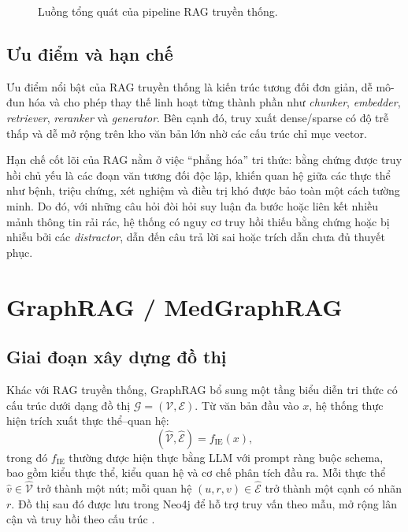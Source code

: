 \documentclass[a4paper,12pt,twoside]{report}
\begin{document}
\begin{figure}[H]
  \centering
  \caption{Luồng tổng quát của pipeline RAG truyền thống.}
  \label{fig:rag-flow}
\end{figure}

\subsection{Ưu điểm và hạn chế}
Ưu điểm nổi bật của RAG truyền thống là kiến trúc tương đối đơn giản, dễ mô-đun hóa và cho phép thay thế linh hoạt từng thành phần như \textit{chunker}, \textit{embedder}, \textit{retriever}, \textit{reranker} và \textit{generator}. Bên cạnh đó, truy xuất dense/sparse có độ trễ thấp và dễ mở rộng trên kho văn bản lớn nhờ các cấu trúc chỉ mục vector.

Hạn chế cốt lõi của RAG nằm ở việc ``phẳng hóa'' tri thức: bằng chứng được truy hồi chủ yếu là các đoạn văn tương đối độc lập, khiến quan hệ giữa các thực thể như bệnh, triệu chứng, xét nghiệm và điều trị khó được bảo toàn một cách tường minh. Do đó, với những câu hỏi đòi hỏi suy luận đa bước hoặc liên kết nhiều mảnh thông tin rải rác, hệ thống có nguy cơ truy hồi thiếu bằng chứng hoặc bị nhiễu bởi các \textit{distractor}, dẫn đến câu trả lời sai hoặc trích dẫn chưa đủ thuyết phục.

\section{GraphRAG / MedGraphRAG}
\subsection{Giai đoạn xây dựng đồ thị}
Khác với RAG truyền thống, GraphRAG bổ sung một tầng biểu diễn tri thức có cấu trúc dưới dạng đồ thị \(\mathcal{G}=(\mathcal{V},\mathcal{E})\). Từ văn bản đầu vào \(x\), hệ thống thực hiện trích xuất thực thể--quan hệ:
\[
  (\hat{\mathcal{V}},\hat{\mathcal{E}})=f_{\text{IE}}(x),
\]
trong đó \(f_{\text{IE}}\) thường được hiện thực bằng LLM với prompt ràng buộc schema, bao gồm kiểu thực thể, kiểu quan hệ và cơ chế phân tích đầu ra. Mỗi thực thể \(\hat{v}\in \hat{\mathcal{V}}\) trở thành một nút; mỗi quan hệ \((u,r,v)\in \hat{\mathcal{E}}\) trở thành một cạnh có nhãn \(r\). Đồ thị sau đó được lưu trong Neo4j để hỗ trợ truy vấn theo mẫu, mở rộng lân cận và truy hồi theo cấu trúc \cite{wu2024}.
\end{document}
